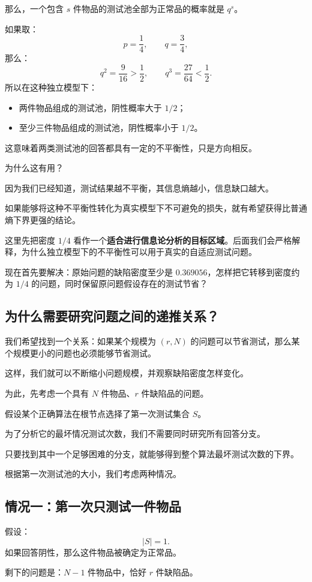 \documentclass[UTF8,11pt]{ctexart}
\begin{document}
那么，一个包含 $s$ 件物品的测试池全部为正常品的概率就是 $q^s$。

如果取：
\[p=\frac14,\qquad q=\frac34,\]
那么：
\[q^2=\frac9{16}>\frac12,\qquad q^3=\frac{27}{64}<\frac12.\]
所以在这种独立模型下：
\begin{itemize}
\item 两件物品组成的测试池，阴性概率大于 $1/2$；
\item 至少三件物品组成的测试池，阴性概率小于 $1/2$。
\end{itemize}
这意味着两类测试池的回答都具有一定的不平衡性，只是方向相反。

为什么这有用？

因为我们已经知道，测试结果越不平衡，其信息熵越小，信息缺口越大。

如果能够将这种不平衡性转化为真实模型下不可避免的损失，就有希望获得比普通熵下界更强的结论。

这里先把密度 $1/4$ 看作一个\textbf{适合进行信息论分析的目标区域}。后面我们会严格解释，为什么独立模型下的不平衡性可以用于真实的自适应测试问题。

现在首先要解决：原始问题的缺陷密度至少是 $0.369056$，怎样把它转移到密度约为 $1/4$ 的问题，同时保留原问题假设存在的测试节省？

\subsection{为什么需要研究问题之间的递推关系？}
我们希望找到一个关系：如果某个规模为 $(r,N)$ 的问题可以节省测试，那么某个规模更小的问题也必须能够节省测试。

这样，我们就可以不断缩小问题规模，并观察缺陷密度怎样变化。

为此，先考虑一个具有 $N$ 件物品、$r$ 件缺陷品的问题。

假设某个正确算法在根节点选择了第一次测试集合 $S$。

为了分析它的最坏情况测试次数，我们不需要同时研究所有回答分支。

只要找到其中一个足够困难的分支，就能够得到整个算法最坏测试次数的下界。

根据第一次测试池的大小，我们考虑两种情况。

\subsection{情况一：第一次只测试一件物品}
假设：
\[|S|=1.\]
如果回答阴性，那么这件物品被确定为正常品。

剩下的问题是：$N-1$ 件物品中，恰好 $r$ 件缺陷品。
\end{document}
